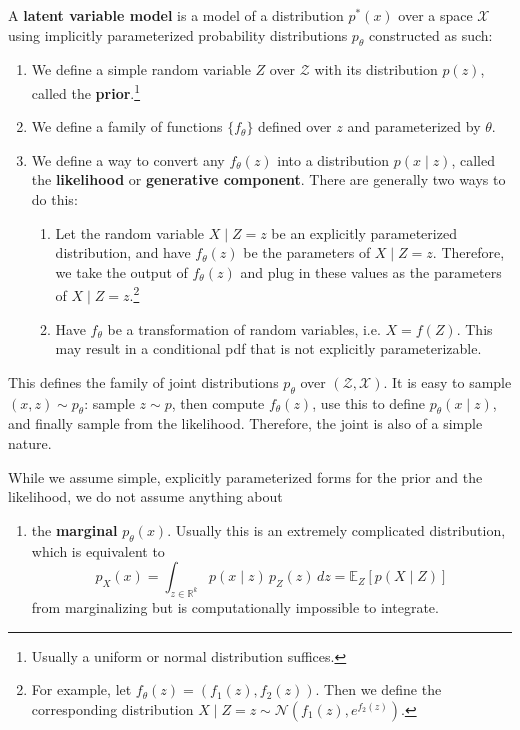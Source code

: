   \begin{definition}
    A \textbf{latent variable model} is a model of a distribution $p^\ast (x)$ over a space $\mathcal{X}$ using implicitly parameterized probability distributions $p_\theta$ constructed as such: 
    \begin{enumerate}
      \item We define a simple random variable $Z$ over $\mathcal{Z}$ with its distribution $p(z)$, called the \textbf{prior}.\footnote{Usually a uniform or normal distribution suffices.} 
      \item We define a family of functions $\{f_\theta\}$ defined over $z$ and parameterized by $\theta$. 
      \item We define a way to convert any $f_\theta(z)$ into a distribution $p(x \mid z)$, called the \textbf{likelihood} or \textbf{generative component}. There are generally two ways to do this: 
      \begin{enumerate}
        \item Let the random variable $X \mid Z = z$ be an explicitly parameterized distribution, and have $f_\theta (z)$ be the parameters of $X \mid Z = z$. Therefore, we take the output of $f_\theta (z)$ and plug in these values as the parameters of $X \mid Z = z$.\footnote{For example, let $f_\theta (z) = (f_1 (z), f_2(z))$. Then we define the corresponding distribution $X \mid Z = z \sim \mathcal{N}(f_1 (z), e^{f_2 (z)} )$.}
        \item Have $f_\theta$ be a transformation of random variables, i.e. $X = f(Z)$. This may result in a conditional pdf that is not explicitly parameterizable.
      \end{enumerate}
    \end{enumerate}
    This defines the family of joint distributions $p_\theta$ over $(\mathcal{Z}, \mathcal{X})$. It is easy to sample $(x, z) \sim p_\theta$: sample $z \sim p$, then compute $f_\theta (z)$, use this to define $p_\theta (x \mid z)$, and finally sample from the likelihood. Therefore, the joint is also of a simple nature. 

    While we assume simple, explicitly parameterized forms for the prior and the likelihood, we do not assume anything about 
    \begin{enumerate}
      \item the \textbf{marginal} $p_\theta (x)$. Usually this is an extremely complicated distribution, which is equivalent to 
      \begin{equation} 
        p_X (x) = \int_{z \in \mathbb{R}^k} p (x \mid z) \, p_Z (z) \,dz = \mathbb{E}_Z [p(X \mid Z)] 
      \end{equation} 
      from marginalizing but is computationally impossible to integrate. 


\end{enumerate}
\end{definition}
